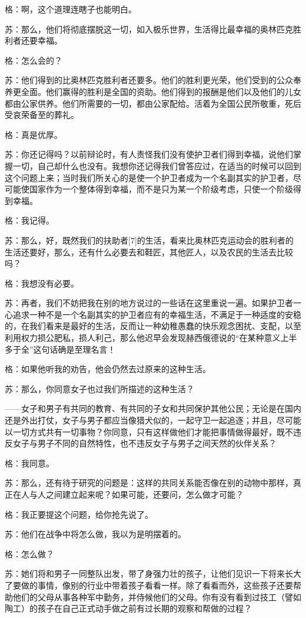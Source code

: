 \documentclass[12pt,oneside]{book}
\begin{document}
格：啊，这个道理连瞎子也能明白。

苏：那么，他们将彻底摆脱这一切，如入极乐世界，生活得比最幸福的奥林匹克胜利者还要幸福。

格：怎么会的？

苏：他们得到的比奥林匹克胜利者还要多。他们的胜利更光荣，他们受到的公众奉养更全面。他们赢得的胜利是全国的资助。他们得到的报酬是他们以及他们的儿女都由公家供养。他们所需要的一切，都由公家配给。活着为全国公民所敬重，死后受哀荣备至的葬礼。

格：真是优厚。

苏：你还记得吗？以前辩论时，有人责怪我们没有使护卫者们得到幸福，说他们掌握一切，自己却什么也没有。我想你还记得我们曾答应过，在适当的时候可以回到这个问题上来；当时我们所关心的是使一个护卫者成为一个名副其实的护卫者，尽可能使国家作为一个整体得到幸福，而不是只为某一个阶级考虑，只使一个阶级得到幸福。

格：我记得。

苏：那么，好，既然我们的扶助者[7]的生活，看来比奥林匹克运动会的胜利者的生活还要好，那么，还有什么必要去和鞋匠，其他匠人，以及农民的生活去比较吗？

格：我想没有必要。

苏：再者，我们不妨把我在别的地方说过的一些话在这里重说一遍。如果护卫者一心追求一种不是一个名副其实的护卫者应有的幸福生活，不满足于一种适度的安稳的，在我们看来是最好的生活，反而让一种幼稚愚蠢的快乐观念困扰、支配，以至利用权力损公肥私，损人利己，那么他迟早会发现赫西俄德说的“在某种意义上半多于全”这句话确是至理名言！

格：如果他听我的劝告，他会仍然去过原来的这种生活。

苏：那么，你同意女子也过我们所描述的这种生活？

——女子和男子有共同的教育、有共同的子女和共同保护其他公民；无论是在国内还是外出打仗，女子与男子都应当像猎犬似的，一起守卫一起追逐；并且，尽可能以一切方式共有一切事物？你同意，只有这样做他们才能把事情做得最好，既不违反女子与男子不同的自然特性，也不违反女子与男子之间天然的伙伴关系？

格：我同意。

苏：那么，还有待于研究的问题是：这样的共同关系能否像在别的动物中那样，真正在人与人之间建立起来呢？如果可能，还要问，怎么做才可能？

格：我正要提这个问题，给你抢先说了。

苏：他们在战争中将怎么做，我以为是明摆着的。

格：怎么做？

苏：她们将和男子一同整队出发，带了身强力壮的孩子，让他们见识一下将来长大了要做的事情，像别的行业中带着孩子看看一样。除了看看而外，这些孩子还要帮助他们的父母从事各种军中勤务，并侍候他们的父母。你有没有看到过技工（譬如陶工）的孩子在自己正式动手做之前有过长期的观察和帮做的过程？
\end{document}
